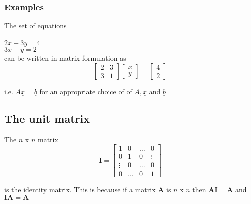 \documentclass[12pt,a4paper]{article}
\theoremstyle{regla}
\theoremstyle{remark}
\theoremstyle{definition}
\theoremstyle{nonumberbreak}
\begin{document}
\subsubsection{Examples}
\begin{xmpl}
The set of equations\\
\\
$2x+3y=4$ \\
$3x+y=2$ \\

can be written in matrix formulation as\\

$$\begin{bmatrix}
2 & 3  \\
3 & 1 
\end{bmatrix}
\begin{bmatrix}
x \\
y
\end{bmatrix} =
\begin{bmatrix}
4 \\
2
\end{bmatrix}
$$

i.e. $A\underline{x} = \underline{b}$ for an appropriate choice of of $A, \underline{x}$ and $\underline{b}$
\end{xmpl}

\subsection{The unit matrix}
\begin{fbox}
\begin{minipage}{0.97\textwidth}
The $n$ x $n$ matrix \\

\begin{equation*}
\mathbf{I}=
\left[
\begin{array}{cccc}
  1 & 0 & \ldots & 0 \\
  0 & 1 & 0  & \vdots \\
  \vdots & 0  & \dots & 0 \\
  0 & \ldots & 0 & 1
\end{array} \right]
\end{equation*}

is the identity matrix. This is because if a matrix $\mathbf{A}$ is $n$ x $n$ then $\mathbf{A} \mathbf{I} = \mathbf{A}$ and $\mathbf{I} \mathbf{A}  = 
\mathbf{A}$
\end{minipage}
\end{fbox}
\end{document}
